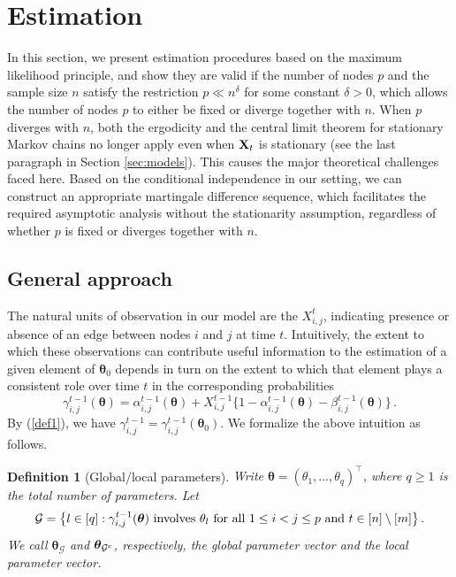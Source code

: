 \documentclass[12pt]{article}
\newtheorem{definition}{Definition}
\newcommand{\btheta}{\boldsymbol \theta}
\def\T{{\scriptscriptstyle \top} }
\newcommand{\bX}{{\bf X}}
\newcommand{\btc}{{\rm c}}
\newcommand{\0}{{\bf 0}}
\begin{document}
\section{Estimation} \label{sec:estimation}

In this section, we present estimation procedures based on the maximum likelihood principle, and show they are valid if the number of nodes $p$ and the sample size $n$ satisfy the restriction $p\ll n^{\delta}$ for some constant $\delta>0$, which allows the number of nodes $p$ to either be fixed or diverge together with $n$.  
When $p$ diverges with $n$, both the ergodicity and the central limit theorem for stationary Markov chains no longer apply even when $\bX_t$ is stationary  (see the last paragraph in Section \ref{sec:models}). This causes the major theoretical challenges faced here. Based on the conditional independence in our setting,  we can construct an appropriate martingale difference sequence, which facilitates %
the required asymptotic analysis without the stationarity assumption, regardless of whether $p$ is fixed or diverges together with $n$. 

\subsection{General approach}\label{sec:gen.appr}

The natural units of observation in our model are the $X^t_{i,j}$, indicating presence or absence of an edge between nodes $i$ and $j$ at time $t$.  Intuitively, the extent to which these observations can contribute useful information to the estimation of a given element of $\btheta_0$ depends in turn on the extent to which that element plays a consistent role over time $t$ in the corresponding probabilities
$$
\gamma_{i,j}^{t-1}(\btheta) =\alpha_{i,j}^{t-1}(\btheta) +X_{i,j}^{t-1}\{1 - \alpha_{i,j}^{t-1}(\btheta) -\beta_{i,j}^{t-1}(\btheta)\}\,.
$$ 
By (\ref{def1}), we have $\gamma_{i,j}^{t-1}=\gamma_{i,j}^{t-1}(\btheta_0)$. We formalize the above intuition as follows.
\begin{definition}[Global/local parameters] 
Write $\btheta=(\theta_1,\ldots,\theta_q)^{\T}$, where $q\ge 1$ is the total number of parameters.  Let 
\begin{align*}
\mathcal{G}=\big\{l\in[q]:\gamma_{i,j}^{t-1}(\btheta)~{\rm involves}~\theta_l~{\rm for~ all}~1\le i< j\le p~{\rm and}~t\in[n]\setminus[m]\big\}\,.
\end{align*}
We call $\btheta_{\mathcal{G}}$ and $\btheta_{\mathcal{G}^{\btc}}$,
respectively, the global parameter vector and the local parameter vector. 
\end{definition}
\end{document}
